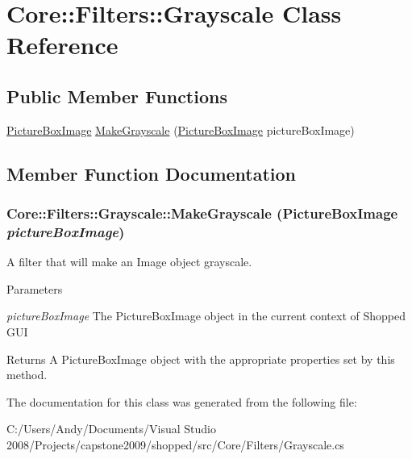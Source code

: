 \hypertarget{class_core_1_1_filters_1_1_grayscale}{
\section{Core::Filters::Grayscale Class Reference}
\label{class_core_1_1_filters_1_1_grayscale}
}
\subsection*{Public Member Functions}
\begin{DoxyCompactItemize}
\item 
\hyperlink{class_core_1_1_images_1_1_picture_box_image}{PictureBoxImage} \hyperlink{class_core_1_1_filters_1_1_grayscale_aed7b431d49987ba71cdf3d232db524b8}{MakeGrayscale} (\hyperlink{class_core_1_1_images_1_1_picture_box_image}{PictureBoxImage} pictureBoxImage)
\end{DoxyCompactItemize}


\subsection{Member Function Documentation}
\hypertarget{class_core_1_1_filters_1_1_grayscale_aed7b431d49987ba71cdf3d232db524b8}{
\subsubsection[{MakeGrayscale}]{ Core::Filters::Grayscale::MakeGrayscale ({\bf PictureBoxImage} {\em pictureBoxImage})}}
\label{class_core_1_1_filters_1_1_grayscale_aed7b431d49987ba71cdf3d232db524b8}
A filter that will make an Image object grayscale.


\begin{DoxyParams}{Parameters}
\item[{\em pictureBoxImage}]The PictureBoxImage object in the current context of Shopped GUI \end{DoxyParams}
\begin{DoxyReturn}{Returns}
A PictureBoxImage object with the appropriate properties set by this method. 
\end{DoxyReturn}


The documentation for this class was generated from the following file:\begin{DoxyCompactItemize}
\item 
C:/Users/Andy/Documents/Visual Studio 2008/Projects/capstone2009/shopped/src/Core/Filters/Grayscale.cs\end{DoxyCompactItemize}
